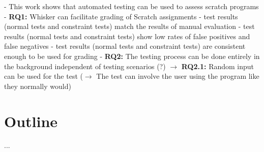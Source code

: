- This work shows that automated testing can be used to assess scratch programs
- \textbf{RQ1:} Whisker can facilitate grading of Scratch assignments
    - test results (normal tests and constraint tests) match the results of manual evaluation
    - test results (normal tests and constraint tests) show low rates of false positives and false negatives
    - test results (normal tests and constraint tests) are consistent enough to be used for grading
- \textbf{RQ2:} The testing process can be done entirely in the background independent of testing scenarios (?)
    $\rightarrow$ \textbf{RQ2.1:} Random input can be used for the test
    ($\rightarrow$ The test can involve the user using the program like they normally would)

\section{Outline}
...

%
